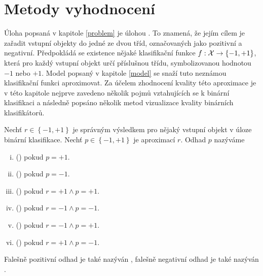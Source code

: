 \chapter{Metody vyhodnocení}

Úloha popsaná v kapitole \ref{problem} je úlohou . To znamená, že jejím cílem je zařadit vstupní objekty do jedné ze dvou tříd, označovaných jako pozitivní a negativní. Předpokládá se existence nějaké klasifikační funkce \( f : \mathcal X \to \left\{ -1, +1 \right\} \), která pro každý vstupní objekt určí příslušnou třídu, symbolizovanou hodnotou \( -1 \) nebo \( +1 \). Model popsaný v kapitole \ref{model} se snaží tuto neznámou klasifikační funkci aproximovat. Za účelem zhodnocení kvality této aproximace je v této kapitole nejprve zavedeno několik pojmů vztahujících se k binární klasifikaci a následně popsáno několik metod vizualizace kvality binárních klasifikátorů. 

\begin{define}
	Nechť \( r \in \left\{ -1, +1 \right\} \) je správným výsledkem pro nějaký vstupní objekt v úloze binární klasifikace. Nechť \( p \in \left\{ -1, +1 \right\} \) je aproximací \( r \). Odhad \( p \) nazýváme
	\begin{enumerate}[i.]
		\item {} () pokud \( p = +1 \).
		\item {} () pokud \( p = -1 \).
		\item {} () pokud \( r = +1 \land p = +1 \).
		\item {} () pokud \( r = -1 \land p = -1 \).
		\item {} () pokud \( r = -1 \land p = +1 \).
		\item {} () pokud \( r = +1 \land p = -1 \).
	\end{enumerate}
	Falešně pozitivní odhad je také nazýván , falešně negativní odhad je také nazýván .
\end{define}


